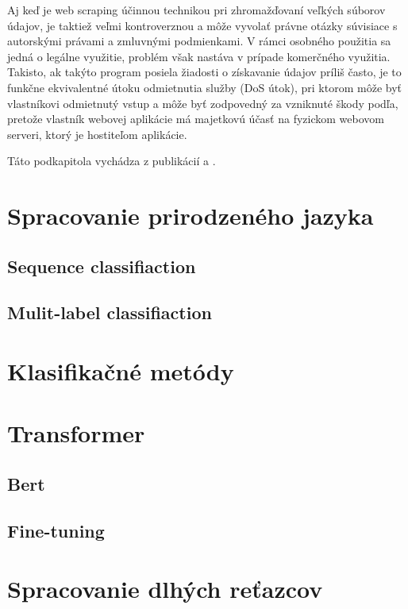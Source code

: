 Aj keď je web scraping účinnou technikou pri zhromažďovaní veľkých súborov údajov, je taktiež veľmi kontroverznou a môže vyvolať právne otázky súvisiace s autorskými právami a zmluvnými podmienkami. V rámci osobného použitia sa jedná o legálne využitie,  problém však nastáva v prípade komerčného využitia. Takisto, ak takýto program posiela žiadosti o získavanie údajov príliš často, je to funkčne ekvivalentné útoku odmietnutia služby (DoS útok), pri ktorom môže byť vlastníkovi odmietnutý vstup a môže byť zodpovedný za vzniknuté škody podľa, pretože vlastník webovej aplikácie má majetkovú účasť na fyzickom webovom serveri, ktorý je hostiteľom aplikácie.

Táto podkapitola vychádza z publikácií \cite{Zhao:2017} a \cite{Sirisuriya:2015}.


\section{Spracovanie prirodzeného jazyka}

\subsection{Sequence classifiaction}

\subsection{Mulit-label classifiaction}


\section{Klasifikačné metódy}


\section{Transformer}

\subsection{Bert}

\subsection{Fine-tuning}


\section{Spracovanie dlhých reťazcov}



